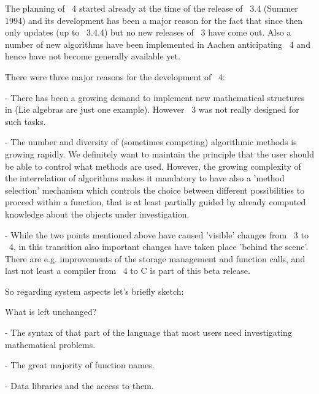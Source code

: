 The  planning of {\GAP}~4 started  already at the time  of the release of
{\GAP}~3.4 (Summer 1994) and its development has been  a major reason for
the fact that  since then  only updates  (up to {\GAP}~3.4.4)  but no new
releases of {\GAP}~3 have come out. Also a number  of new algorithms have
been implemented   in  Aachen anticipating {\GAP}~4   and  hence have not
become generally available yet.

There were three major reasons for the development of {\GAP}~4:

\beginlist
  \item{-}
    There has  been a  growing   demand  to implement  new   mathematical
    structures in  {\GAP} (Lie algebras are just  one  example).  However
    {\GAP}~3 was not really designed for such tasks.

  \item{-}
    The number and diversity of (sometimes competing) algorithmic methods
    is  growing rapidly.   We  definitely want  to maintain the principle
    that the  user  should  be  able to control   what  methods are used.
    However, the growing complexity  of  the interrelation of  algorithms
    makes it mandatory to have  also a 'method selection' mechanism which
    controls the choice between different possibilities to proceed within
    a  {\GAP} function,  that  is  at least  partially  guided by already
    computed knowledge about the objects under investigation.

  \item{-}
    While the two  points mentioned above  have  caused 'visible' changes
    from {\GAP}~3 to {\GAP}~4, in  this transition also important changes
    have taken place 'behind the scene'.  There are e.g.  improvements of
    the  storage  management and function  calls,   and last  not least a
    compiler from {\GAP}~4 to C is part of this beta release.
\endlist

So regarding system aspects let's briefly sketch:

What is left unchanged?

\beginlist
  \item{-}
    The syntax of that part  of the {\GAP} language  that most users need
    investigating mathematical problems.

  \item{-}
    The great majority of function names.

  \item{-}
    Data libraries and the access to them.
\enditems

